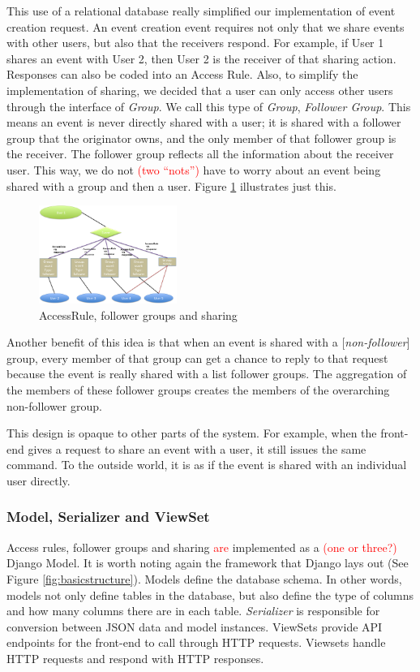 \documentclass[a4paper]{article}
\newcommand{\comment}[1]{\textcolor{red}{#1}}
\begin{document}
This use of a relational database really simplified our implementation of event creation request. An event creation event requires not only that we share events with other users, but also that the receivers respond. For example, if User 1 shares an event with User 2, then User 2 is the receiver of that sharing action. Responses can also be coded into an Access Rule. Also, to simplify the implementation of sharing, we decided that a user can only access other users through the interface of \emph{Group}. We call this type of \emph{Group}, \emph{Follower Group}. This means an event is never directly shared with a user; it is shared with a follower group that the originator owns, and the only member of that follower group is the receiver. The follower group reflects all the information about the receiver user. This way, we do not \comment{(two ``nots'')} have to worry about an event being shared with a group and then a user. Figure \ref{fig:sharing2} illustrates just this. 

\begin{figure}[h]
\centering
\includegraphics[width=0.4\textwidth]{sharing2.png}
\caption{\label{fig:sharing2}AccessRule, follower groups and sharing}
\end{figure}

Another benefit of this idea is that when an event is shared with a [\emph{non-follower}] group, every member of that group can get a chance to reply to that request because the event is really shared with a list follower groups. The aggregation of the members of these follower groups creates the members of the overarching non-follower group. 

This design is opaque to other parts of the system. For example, when the front-end gives a request to share an event with a user, it still issues the same command. To the outside world, it is as if the event is shared with an individual user directly.

\subsubsection{Model, Serializer and ViewSet}
Access rules, follower groups and sharing \comment{are} implemented as a \comment{(one or three?)} Django Model. It is worth noting again the framework that Django lays out (See Figure \ref{fig:basicstructure}). Models define the database schema. In other words, models not only define tables in the database, but also define the type of columns and how many columns there are in each table. \emph{Serializer} is responsible for conversion between JSON data and model instances. ViewSets provide API endpoints for the front-end to call through HTTP requests. Viewsets handle HTTP requests and respond with HTTP responses. 
\end{document}

